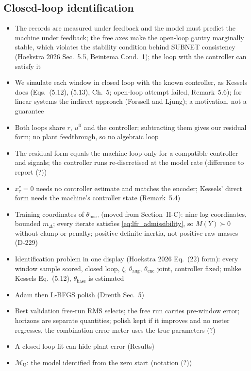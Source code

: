 \subsection{Closed-loop identification}\label{sec:aug_closed_loop}
\ifdraft
\begin{itemize}
\item The records are measured under feedback and the model must predict the machine under feedback; the free axes make the open-loop gantry marginally stable, which violates the stability condition behind SUBNET consistency (Hoekstra 2026 Sec.~5.5, Beintema Cond.~1); the loop with the controller can satisfy it
\item We simulate each window in closed loop with the known controller, as Kessels does (Eqs.~(5.12), (5.13), Ch.~5; open-loop attempt failed, Remark~5.6); for linear systems the indirect approach (Forssell and Ljung); a motivation, not a guarantee
\item Both loops share $r$, $u^{\mathrm{ff}}$ and the controller; subtracting them gives our residual form; no plant feedthrough, so no algebraic loop
\item The residual form equals the machine loop only for a compatible controller and signals; the controller runs re-discretised at the model rate (difference to report (?))
\item $x^{c}_\tau=0$ needs no controller estimate and matches the encoder; Kessels' direct form needs the machine's controller state (Remark~5.4)
\item Training coordinates of $\theta_{\mathrm{base}}$ (moved from Section~II-C): nine log coordinates, bounded $m_\Delta$; every iterate satisfies \eqref{eq:lfr_admissibility}, so $M(Y)\succ0$ without clamp or penalty; positive-definite inertia, not positive raw masses (D-229)
\item Identification problem in one display (Hoekstra 2026 Eq.~(22) form): every window sample scored, closed loop, $\xi$, $\theta_{\mathrm{aug}}$, $\theta_{\mathrm{enc}}$ joint, controller fixed; unlike Kessels Eq.~(5.12), $\theta_{\mathrm{base}}$ is estimated
\item Adam then L-BFGS polish (Drenth Sec.~5)
\item Best validation free-run RMS selects; the free run carries pre-window error; horizons are separate quantities; polish kept if it improves and no meter regresses, the combination-error meter uses the true parameters (?)
\item A closed-loop fit can hide plant error (Results)
\item $\mathcal M_{\mathrm U}$: the model identified from the zero start (notation (?))
\end{itemize}
\fi

